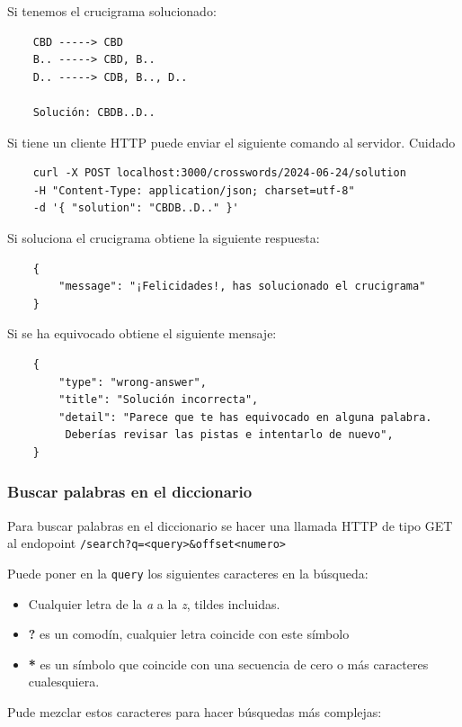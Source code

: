 \documentclass[12pt, a4paper]{article}
\begin{document}
Si tenemos el crucigrama solucionado:

\begin{verbatim}
	CBD -----> CBD
	B.. -----> CBD, B..
	D.. -----> CDB, B.., D..
	
	Solución: CBDB..D..
\end{verbatim}

Si tiene un cliente HTTP puede enviar el siguiente comando al servidor.
Cuidado 

\begin{verbatim}
	curl -X POST localhost:3000/crosswords/2024-06-24/solution
	-H "Content-Type: application/json; charset=utf-8"
	-d '{ "solution": "CBDB..D.." }'
\end{verbatim}

Si soluciona el crucigrama obtiene la siguiente respuesta:

\begin{verbatim}
	{
		"message": "¡Felicidades!, has solucionado el crucigrama"
	}
\end{verbatim}

Si se ha equivocado obtiene el siguiente mensaje:

\begin{verbatim}
	{
		"type": "wrong-answer",
		"title": "Solución incorrecta",
		"detail": "Parece que te has equivocado en alguna palabra.
		 Deberías revisar las pistas e intentarlo de nuevo",
	}
\end{verbatim}

\subsubsection{Buscar palabras en el diccionario}

Para buscar palabras en el diccionario se hacer una llamada HTTP de tipo GET al
endopoint \verb*|/search?q=<query>&offset<numero>|

Puede poner en la \verb*|query| los siguientes caracteres en la búsqueda:

\begin{itemize}
	\item Cualquier letra de la \textit{a} a la \textit{z}, tildes
	incluidas.
	\item \textbf{?} es un comodín, cualquier letra coincide con
	este símbolo
	\item \textbf{*} es un símbolo que coincide con una secuencia de cero o más
	caracteres cualesquiera.
\end{itemize}

Pude mezclar estos caracteres para hacer búsquedas más complejas:
\end{document}
